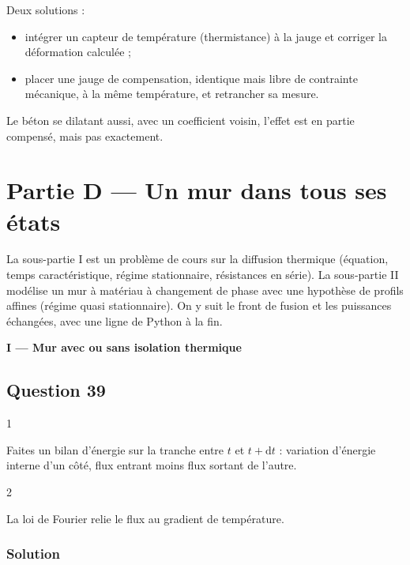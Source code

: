 \documentclass[11pt,a4paper]{article}
\providecommand{\tightlist}{\setlength{\itemsep}{0pt}\setlength{\parskip}{0pt}}
\begin{document}
Deux solutions :

\begin{itemize}
\tightlist
\item
  intégrer un capteur de température (thermistance) à la jauge et corriger la déformation calculée ;
\item
  placer une jauge de compensation, identique mais libre de contrainte mécanique, à la même température, et retrancher sa mesure.
\end{itemize}

Le béton se dilatant aussi, avec un coefficient voisin, l'effet est en partie compensé, mais pas exactement.

\hypertarget{partie-d-un-mur-dans-tous-ses-uxe9tats}{%
\section{Partie D --- Un mur dans tous ses états}\label{partie-d-un-mur-dans-tous-ses-uxe9tats}}

La sous-partie I est un problème de cours sur la diffusion thermique (équation, temps caractéristique, régime stationnaire, résistances en série). La sous-partie II modélise un mur à matériau à changement de phase avec une hypothèse de profils affines (régime quasi stationnaire). On y suit le front de fusion et les puissances échangées, avec une ligne de Python à la fin.

\textbf{I --- Mur avec ou sans isolation thermique}

\hypertarget{question-39}{%
\subsection{Question 39}\label{question-39}}

\begin{indication}{1}

Faites un bilan d'énergie sur la tranche entre \(t\) et \(t+\mathrm{d}t\) : variation d'énergie interne d'un côté, flux entrant moins flux sortant de l'autre.

\end{indication}

\begin{indication}{2}

La loi de Fourier relie le flux au gradient de température.

\end{indication}

\hypertarget{solution-38}{%
\subsubsection{Solution}\label{solution-38}}
\end{document}
